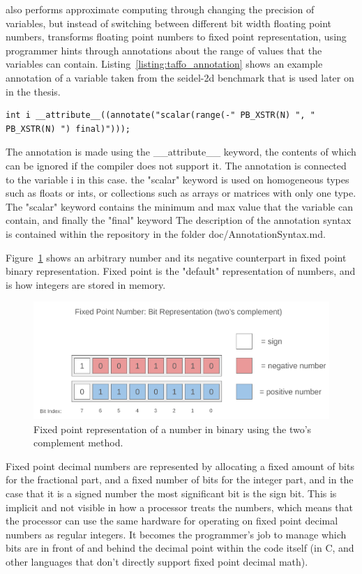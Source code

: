 \taffo{} also performs approximate computing through changing the precision of variables, but instead of switching between different bit width floating point numbers, \taffo{} transforms floating point numbers to fixed point representation, using programmer hints through annotations about the range of values that the variables can contain. Listing~\ref{listing:taffo_annotation} shows an example annotation of a variable taken from the seidel-2d benchmark that is used later on in the thesis.


\begin{lstlisting}
int i __attribute__((annotate("scalar(range(-" PB_XSTR(N) ", " PB_XSTR(N) ") final)")));
\end{lstlisting}

The annotation is made using the \_\_attribute\_\_ keyword, the contents of which can be ignored if the compiler does not support it. The annotation is connected to the variable i in this case. the "scalar" keyword is used on homogeneous types such as floats or ints, or collections such as arrays or matrices with only one type. The "scalar" keyword contains the minimum and max value that the variable can contain, and finally the "final" keyword
The description of the annotation syntax is contained within the \taffo{} repository in the folder doc/AnnotationSyntax.md. 

Figure~\ref{fig:fixed_point_representation} shows an arbitrary number and its negative counterpart in fixed point binary representation. Fixed point is the "default" representation of numbers, and is how integers are stored in memory.

\begin{figure}
    \centering
    \includegraphics[width=0.75\linewidth]{Images/fixed_point_bit_representation.png}
    \caption{Fixed point representation of a number in binary using the two's complement method.}
    \label{fig:fixed_point_representation}
\end{figure}

Fixed point decimal numbers are represented by allocating a fixed amount of bits for the fractional part, and a fixed number of bits for the integer part, and in the case that it is a signed number the most significant bit is the sign bit. This is implicit and not visible in how a processor treats the numbers, which means that the processor can use the same hardware for operating on fixed point decimal numbers as regular integers. 
It becomes the programmer's job to manage which bits are in front of and behind the decimal point within the code itself (in C, and other languages that don't directly support fixed point decimal math). 

